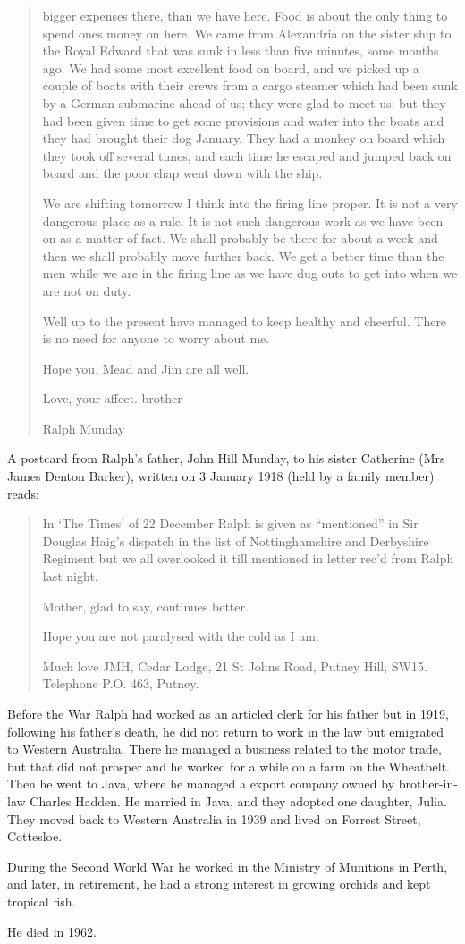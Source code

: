 \begin{quotation}
bigger expenses there, than we have here. Food is about the only thing to spend ones money on here. We came from Alexandria on the sister ship to the Royal Edward that was sunk in less than five minutes, some months ago. We had some most excellent food on board, and we picked up a couple of boats with their crews from a cargo steamer which had been sunk by a German submarine ahead of us; they were glad to meet us; but they had been given time to get some provisions and water into the boats and they had brought their dog January. They had a monkey on board which they took off several times, and each time he escaped and jumped back on board and the poor chap went down with the ship.

We are shifting tomorrow I think into the firing line proper. It is not a very dangerous place as a rule. It is not such dangerous work as we have been on as a matter of fact. We shall probably be there for about a week and then we shall probably move further back. We get a better time than the men while we are in the firing line as we have dug outs to get into when we are not on duty.

Well up to the present have managed to keep healthy and cheerful. There is no need for anyone to worry about me.

Hope you, Mead and Jim are all well.

Love, your affect. brother

Ralph Munday
\end{quotation}

A postcard from Ralph's father, John Hill Munday, to his sister Catherine (Mrs James Denton Barker), written on 3 January 1918 (held by a family member) reads:

\begin{quotation}
In `The Times' of 22 December Ralph is given as ``mentioned'' in Sir Douglas Haig's dispatch in the list of Nottinghamshire and Derbyshire Regiment but we all overlooked it till mentioned in letter rec'd from Ralph last night.

Mother, glad to say, continues better.

Hope you are not paralysed with the cold as I am.

Much love JMH, Cedar Lodge, 21 St Johns Road, Putney Hill, SW15.
Telephone P.O. 463, Putney.
\end{quotation}

Before the War Ralph had worked as an articled clerk for his father but in 1919, following his father's death, he did not return to work in the law but emigrated to Western Australia.  There he managed a business related to the motor trade, but that did not prosper and he worked for a while on a farm on the Wheatbelt. Then he went to Java,  where he managed a export company owned by brother-in-law Charles Hadden.  He married  in Java,\cite{LadiesSection} and they adopted one daughter, Julia.
They  moved back to Western Australia in 1939 and lived on Forrest Street, Cottesloe. 

During the Second World War he worked in the Ministry of Munitions in Perth, and later, in retirement, he had a strong interest in growing orchids and kept tropical fish. 

He died in 1962.\cite{RalphMundayBMD}




  
